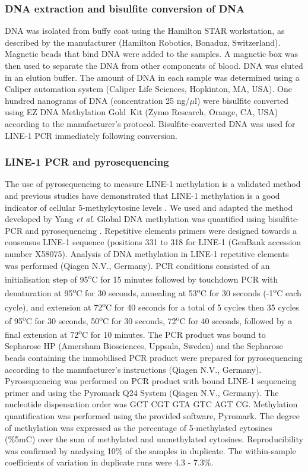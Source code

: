 \subsubsection{DNA extraction and bisulfite conversion of DNA} %
\noindent DNA was isolated from buffy coat using the Hamilton STAR workstation, as described by the manufacturer (Hamilton Robotics, Bonaduz, Switzerland). Magnetic beads that bind DNA were added to the samples. A magnetic box was then used to separate the DNA from other components of blood. DNA was eluted in an elution buffer. The amount of DNA in each sample was determined using a Caliper automation system (Caliper Life Sciences, Hopkinton, MA, USA). One hundred nanograms of DNA (concentration 25 ng/$\mu$l) were bisulfite converted using EZ DNA Methylation Gold\texttrademark~Kit (Zymo Research, Orange, CA, USA) according to the manufacturer's protocol. Bisulfite-converted DNA was used for LINE-1 PCR immediately following conversion. 

\subsubsection{LINE-1 PCR and pyrosequencing} %
\noindent The use of pyrosequencing to measure LINE-1 methylation is a validated method and previous studies have demonstrated that LINE-1 methylation is a good indicator of cellular 5-methylcytosine levels \cite{c56}. We used and adapted the method developed by Yang \emph{et al}. Global DNA methylation was quantified using bisulfite-PCR and pyrosequencing \cite{c56}. Repetitive elements primers were designed towards a consensus LINE-1 sequence (positions 331 to 318 for LINE-1 (GenBank accession number X58075). Analysis of DNA methylation in LINE-1 repetitive elements was performed (Qiagen N.V., Germany). PCR conditions consisted of an initialisation step of 95\textsuperscript{o}C for 15 minutes followed by touchdown PCR with denaturation at 95\textsuperscript{o}C for 30 seconds, annealing at 53\textsuperscript{o}C for 30 seconds (-1\textsuperscript{o}C each cycle), and extension at 72\textsuperscript{o}C for 40 seconds for a total of 5 cycles then 35 cycles of 95\textsuperscript{o}C for 30 seconds, 50\textsuperscript{o}C for 30 seconds, 72\textsuperscript{o}C for 40 seconds, followed by a final extension at 72\textsuperscript{o}C for 10 minutes. The PCR product was bound to Sepharose HP (Amersham Biosciences, Uppsala, Sweden) and the Sepharose beads containing the immobilised PCR product were prepared for pyrosequencing according to the manufacturer's instructions (Qiagen N.V., Germany). Pyrosequencing was performed on PCR product with bound LINE-1 sequencing primer and using the Pyromark Q24 System (Qiagen N.V., Germany). The nucleotide dispensation order was GCT CGT GTA GTC AGT CG. Methylation quantification was performed using the provided software, Pyromark. The degree of methylation was expressed as the percentage of 5-methylated cytosines (\%5mC) over the sum of methylated and unmethylated cytosines. Reproducibility was confirmed by analysing 10\% of the samples in duplicate. The within-sample coefficients of variation in duplicate runs were 4.3 - 7.3\%.

